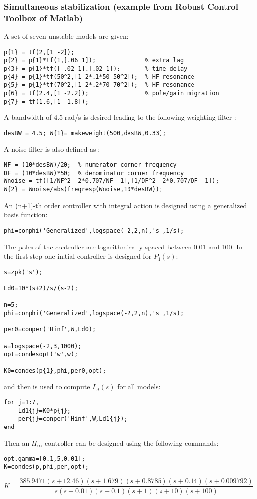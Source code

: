 \documentclass [12pt , a4paper] {report}
\begin{document}
\subsubsection{Simultaneous stabilization (example from Robust Control Toolbox of Matlab)}

A set of seven unstable models are given:
\begin{lstlisting} 
p{1} = tf(2,[1 -2]);
p{2} = p{1}*tf(1,[.06 1]);              % extra lag
p{3} = p{1}*tf([-.02 1],[.02 1]);       % time delay
p{4} = p{1}*tf(50^2,[1 2*.1*50 50^2]);  % HF resonance
p{5} = p{1}*tf(70^2,[1 2*.2*70 70^2]);  % HF resonance
p{6} = tf(2.4,[1 -2.2]);                % pole/gain migration
p{7} = tf(1.6,[1 -1.8]); 
\end{lstlisting}
A bandwidth of 4.5 rad/s is desired leading  to the following weighting filter :

\begin{lstlisting}
desBW = 4.5; W{1}= makeweight(500,desBW,0.33);
\end{lstlisting}
A noise filter is also defined as :
\begin{lstlisting}
NF = (10*desBW)/20;  % numerator corner frequency
DF = (10*desBW)*50;  % denominator corner frequency
Wnoise = tf([1/NF^2  2*0.707/NF  1],[1/DF^2  2*0.707/DF  1]);
W{2} = Wnoise/abs(freqresp(Wnoise,10*desBW));
\end{lstlisting}
An (n+1)-th order controller with integral action is designed using a generalized basis function:

\begin{lstlisting}
phi=conphi('Generalized',logspace(-2,2,n),'s',1/s);
\end{lstlisting}
The poles of the controller are logarithmically spaced between 0.01 and 100. In the first step one initial controller is designed for $P_1(s)$: 
\begin{lstlisting}
s=zpk('s');

Ld0=10*(s+2)/s/(s-2);

n=5;
phi=conphi('Generalized',logspace(-2,2,n),'s',1/s);

per0=conper('Hinf',W,Ld0);

w=logspace(-2,3,1000);
opt=condesopt('w',w);

K0=condes(p{1},phi,per0,opt);
\end{lstlisting}
and then is used to compute $L_d(s)$ for all models:
\begin{lstlisting}
for j=1:7,    
    Ld1{j}=K0*p{j};
    per{j}=conper('Hinf',W,Ld1{j});
end
\end{lstlisting}
Then an $H_\infty$ controller can be designed using the following commands:
\begin{lstlisting}
opt.gamma=[0.1,5,0.01];
K=condes(p,phi,per,opt);  
\end{lstlisting}
$$K= \frac{385.9471 (s+12.46) (s+1.679) (s+0.8785) (s+0.14) (s+0.009792)}{s (s+0.01) (s+0.1) (s+1) (s+10) (s+100) }$$
               
\end{document}
